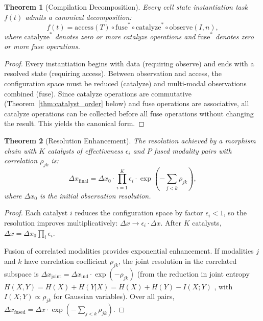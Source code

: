 \documentclass[twocolumn,10pt,a4paper]{article}
\newtheorem{theorem}{Theorem}[section]
\theoremstyle{definition}
\theoremstyle{remark}
\begin{document}
\begin{theorem}[Compilation Decomposition]
\label{thm:decomposition}
Every cell state instantiation task $f(t)$ admits a canonical decomposition:
\begin{equation}
    f(t) = \mathrm{access}(T) \circ \mathrm{fuse}^* \circ \mathrm{catalyze}^* \circ \mathrm{observe}(I, n),
    \label{eq:decomposition}
\end{equation}
where $\mathrm{catalyze}^*$ denotes zero or more catalyze operations and $\mathrm{fuse}^*$ denotes zero or more fuse operations.
\end{theorem}

\begin{proof}
Every instantiation begins with data (requiring observe) and ends with a resolved state (requiring access). Between observation and access, the configuration space must be reduced (catalyze) and multi-modal observations combined (fuse). Since catalyze operations are commutative (Theorem~\ref{thm:catalyst_order} below) and fuse operations are associative, all catalyze operations can be collected before all fuse operations without changing the result. This yields the canonical form.
\end{proof}

\begin{theorem}[Resolution Enhancement]
\label{thm:resolution}
The resolution achieved by a morphism chain with $K$ catalysts of effectiveness $\epsilon_i$ and $P$ fused modality pairs with correlation $\rho_{jk}$ is:
\begin{equation}
    \Delta x_{\mathrm{final}} = \Delta x_0 \cdot \prod_{i=1}^{K} \epsilon_i \cdot \exp\!\left(-\sum_{j<k} \rho_{jk}\right),
    \label{eq:resolution}
\end{equation}
where $\Delta x_0$ is the initial observation resolution.
\end{theorem}

\begin{proof}
Each catalyst $i$ reduces the configuration space by factor $\epsilon_i < 1$, so the resolution improves multiplicatively: $\Delta x \to \epsilon_i \cdot \Delta x$. After $K$ catalysts, $\Delta x = \Delta x_0 \prod_i \epsilon_i$.

Fusion of correlated modalities provides exponential enhancement. If modalities $j$ and $k$ have correlation coefficient $\rho_{jk}$, the joint resolution in the correlated subspace is $\Delta x_{\mathrm{joint}} = \Delta x_{\mathrm{ind}} \cdot \exp(-\rho_{jk})$ (from the reduction in joint entropy $H(X,Y) = H(X) + H(Y|X) = H(X) + H(Y) - I(X;Y)$ \citep{CoverThomas2006}, with $I(X;Y) \propto \rho_{jk}$ for Gaussian variables). Over all pairs, $\Delta x_{\mathrm{fused}} = \Delta x \cdot \exp(-\sum_{j<k} \rho_{jk})$.
\end{proof}
\end{document}
